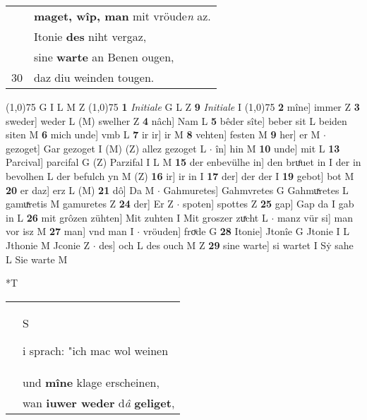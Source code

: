 \documentclass[8pt,a4paper,notitlepage]{article}
\begin{document}
\begin{table}[ht]
\begin{minipage}[t]{0.5\linewidth}
\begin{tabular}{rl}
 & \textbf{maget, wîp, man} mit vröude\textit{n} az.\\ 
 & Itonie \textbf{des} niht vergaz,\\ 
 & sine \textbf{warte} an Benen ougen,\\ 
30 & daz diu weinden tougen.\\ 
\end{tabular}
\scriptsize
\line(1,0){75} \newline
G I L M Z \newline
\line(1,0){75} \newline
\textbf{1} \textit{Initiale} G L Z  \textbf{9} \textit{Initiale} I  \newline
\line(1,0){75} \newline
\textbf{2} mîne] immer Z \textbf{3} sweder] weder L (M) swelher Z \textbf{4} nâch] Nam L \textbf{5} bêder sîte] beber sit L beiden siten M \textbf{6} mich unde] vmb L \textbf{7} ir ir] ir M \textbf{8} vehten] festen M \textbf{9} her] er M  $\cdot$ gezoget] Gar gezoget I (M) (Z) allez gezoget L  $\cdot$ în] hin M \textbf{10} unde] mit L \textbf{13} Parcival] parcifal G (Z) Parzifal I L M \textbf{15} der enbevülhe in] den bruͦuet in I der in bevolhen L der befulch yn M (Z) \textbf{16} ir] ir in I \textbf{17} der] der der I \textbf{19} gebot] bot M \textbf{20} er daz] erz L (M) \textbf{21} dô] Da M  $\cdot$ Gahmuretes] Gahmvretes G Gahmuͯretes L gamuͯretis M gamuretes Z \textbf{24} der] Er Z  $\cdot$ spoten] spottes Z \textbf{25} gap] Gap da I gab in L \textbf{26} mit grôzen zühten] Mit zuhten I Mit groszer zuͯcht L  $\cdot$ manz vür si] man vor isz M \textbf{27} man] vnd man I  $\cdot$ vröuden] froͮde G \textbf{28} Itonie] Jtonîe G Jtonie I L Jthonie M Jconie Z  $\cdot$ des] och L des ouch M Z \textbf{29} sine warte] si wartet I Sẏ sahe L Sie warte M \newline
\end{minipage}
\hspace{0.5cm}
\begin{minipage}[t]{0.5\linewidth}
\small
\begin{center}*T
\end{center}
\begin{tabular}{rl}
 & \begin{large}S\end{large}i sprach: "ich mac wol weinen\\ 
 & und \textbf{mîne} klage erscheinen,\\ 
 & wan \textbf{iuwer weder} d\textit{â} \textbf{geliget},\\ 

\end{tabular}
\end{minipage}
\end{table}
\end{document}
